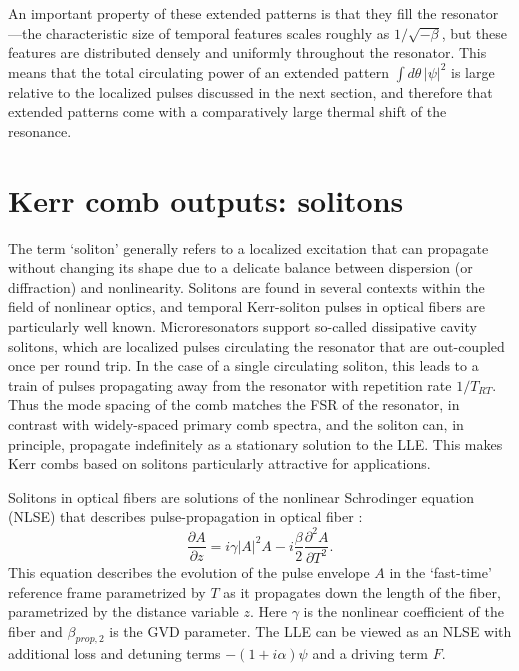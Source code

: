 {An important property of these extended patterns is that they fill the resonator---the characteristic size of temporal features scales roughly as $1/\sqrt{-\beta}$, but these features are distributed densely and uniformly throughout the resonator. This means that the total circulating power of an extended pattern $\int d\theta\, |\psi|^2$ is large relative to the localized pulses discussed in the next section, and therefore that extended patterns come with a comparatively large thermal shift of the resonance. 



\section{Kerr comb outputs: solitons} \label{sec:LLEsolitons}

The term `soliton' generally refers to a localized excitation that can propagate without changing its shape due to a delicate balance between dispersion (or diffraction) and nonlinearity. Solitons are found in several contexts within the field of nonlinear optics, and temporal Kerr-soliton pulses in optical fibers are particularly well known. Microresonators support so-called dissipative cavity solitons, which are localized pulses circulating the resonator that are out-coupled once per round trip. In the case of a single circulating soliton, this leads to a train of pulses propagating away from the resonator with repetition rate $1/T_{RT}$. Thus the mode spacing of the comb matches the FSR of the resonator, in contrast with widely-spaced primary comb spectra, and the soliton can, in principle, propagate indefinitely as a stationary solution to the LLE. This makes Kerr combs based on solitons particularly attractive for applications.

Solitons in optical fibers are solutions of the nonlinear Schrodinger equation (NLSE) that describes pulse-propagation in optical fiber \cite{Agrawal2007}:
\begin{equation}
\frac{\partial A}{\partial z}= i\gamma|A|^2 A -i \frac{\beta}{2} \frac{\partial^2 A}{\partial T^2}. \label{NLSE}
\end{equation}
This equation describes the evolution of the pulse envelope $A$ in the `fast-time' reference frame parametrized by $T$ as it propagates down the length of the fiber, parametrized by the distance variable $z$. Here $\gamma$ is the nonlinear coefficient of the fiber and $\beta_{prop,2}$ is the GVD parameter. The LLE can be viewed as an NLSE with additional loss and detuning terms $-(1+i\alpha)\psi$ and a driving term $F$.

}
